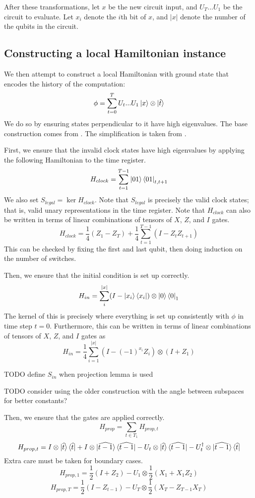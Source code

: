 After these transformations, let $x$ be the new circuit input, and $U_T...U_1$ be the circuit to evaluate. Let $x_i$ denote the $i$th bit of $x$, and $|x|$ denote the number of the qubits in the circuit.

\subsection{Constructing a local Hamiltonian instance}

We then attempt to construct a local Hamiltonian with ground state that encodes the history of the computation: $$\phi=\sum_{t=0}^TU_t...U_1\ket{x}\otimes\ket{\hat{t}}$$
We do so by ensuring states perpendicular to it have high eigenvalues. The base construction comes from \cite{kitaev2002classical}. The simplification is taken from \cite{PhysRevA.78.012352}.

First, we ensure that the invalid clock states have high eigenvalues by applying the following Hamiltonian to the time register.
$$H_{clock}=\sum_{t=1}^{T-1}\ket{01}\bra{01}_{t,t+1}$$
We also set $S_{legal}=\ker H_{clock}$. Note that $S_{legal}$ is precisely the valid clock states; that is, valid unary representations in the time register. Note that $H_{clock}$ can also be written in terms of linear combinations of tensors of $X$, $Z$, and $I$ gates.
$$H_{clock}=\frac{1}{4}(Z_1 - Z_T) + \frac{1}{4}\sum_{t=1}^{T-1}(I-Z_tZ_{t+1}) $$
This can be checked by fixing the first and last qubit, then doing induction on the number of switches.

Then, we ensure that the initial condition is set up correctly.
$$H_{in}=\sum_i^{|x|}(I-\ket{x_i}\bra{x_i})\otimes\ket{0}\bra{0}_1$$
The kernel of this is precisely where everything is set up consistently with $\phi$ in time step $t=0$. Furthermore, this can be written in terms of linear combinations of tensors of $X$, $Z$, and $I$ gates as
$$H_{in}=\frac{1}{4}\sum_{i=1}^{|x|}(I-(-1)^{x_i}Z_i)\otimes(I+Z_1)$$

TODO define $S_{in}$ when projection lemma is used

TODO consider using the older construction with the angle between subspaces for better constants?

Then, we ensure that the gates are applied correctly.
$$H_{prop}=\sum_{t\in T_1}H_{prop,t}$$
$$H_{prop,t}=I\otimes\ket{\widehat{t}}\bra{\widehat{t}}
	+I\otimes\ket{\widehat{t-1}}\bra{\widehat{t-1}}
	-U_t\otimes\ket{\widehat{t}}\bra{\widehat{t-1}}
	-U_t^\dagger\otimes\ket{\widehat{t-1}}\bra{\widehat{t}}$$
Extra care must be taken for boundary cases.
$$H_{prop,1}=\frac{1}{2}(I+Z_2)-U_1\otimes\frac{1}{2}(X_1+X_1Z_2)$$
$$H_{prop,T}=\frac{1}{2}(I-Z_{t-1})-U_T\otimes\frac{1}{2}(X_T-Z_{T-1}X_T)$$

